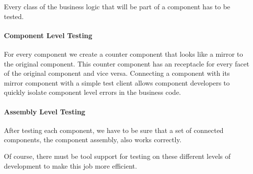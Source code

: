 Every class of the business logic that will be part of a component has to be
tested.

\paragraph{Component Level Testing}

For every component we create a counter component that looks like a mirror to
the original component. This counter component has an receptacle for every facet
of the original component and vice versa. Connecting a component with its mirror
component with a simple test client allows component developers to quickly
isolate component level errors in the business code.

\paragraph{Assembly Level Testing}

After testing each component, we have to be sure that a set of connected
components, the component assembly, also works correctly.

Of course, there must be tool support for testing on these different levels of
development to make this job more efficient.

